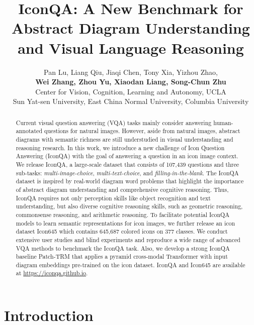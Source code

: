\documentclass{article}
\title{IconQA: A New Benchmark for Abstract Diagram Understanding and Visual Language Reasoning}
\author{Pan Lu, Liang Qiu, Jiaqi Chen, Tony Xia, Yizhou Zhao,  \\\textbf{ Wei Zhang, Zhou Yu, Xiaodan Liang, Song-Chun Zhu} \\
  Center for Vision, Cognition, Learning and Autonomy, UCLA \\
  Sun Yat-sen University, East China Normal University, 
  Columbia University
}
\begin{document}
\maketitle

\vspace{-2mm}
\begin{abstract}
Current visual question answering (VQA) tasks mainly consider answering human-annotated questions for natural images. However, aside from natural images, abstract diagrams with semantic richness are still understudied in visual understanding and reasoning research. In this work, we introduce a new challenge of Icon Question Answering (IconQA) with the goal of answering a question in an icon image context. We release IconQA, a large-scale dataset that consists of 107,439 questions and three sub-tasks: \textit{multi-image-choice}, \textit{multi-text-choice}, and \textit{filling-in-the-blank}. The IconQA dataset is inspired by real-world diagram word problems that highlight the importance of abstract diagram understanding and comprehensive cognitive reasoning. Thus, IconQA requires not only perception skills like object recognition and text understanding, but also diverse cognitive reasoning skills, such as geometric reasoning, commonsense reasoning, and arithmetic reasoning. To facilitate potential IconQA models to learn semantic representations for icon images, we further release an icon dataset Icon645 which contains 645,687 colored icons on 377 classes. We conduct extensive user studies and blind experiments and reproduce a wide range of advanced VQA methods to benchmark the IconQA task. Also, we develop a strong IconQA baseline Patch-TRM that applies a pyramid cross-modal Transformer with input diagram embeddings pre-trained on the icon dataset. IconQA and Icon645 are available at \url{https://iconqa.github.io}.

\end{abstract}

\vspace{-2mm}

\section{Introduction}
\end{document}
